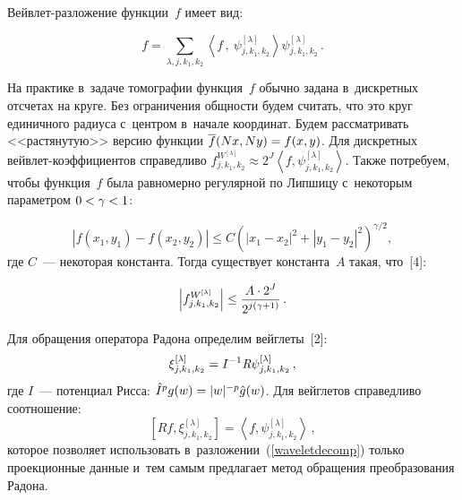 \begin{multicols}{2}
Вейвлет-разложение функции~$f$ имеет вид:

\vspace*{4pt}

\noindent
\begin{equation}
\label{waveletdecomp}
f = \sum\limits_{\lambda,j,k_1,k_2} \left\langle f\,,\
\psi^{[\lambda]}_{j,k_1,k_2}\right\rangle \psi^{[\lambda]}_{j,k_1,k_2}\,.
\end{equation}


\vspace*{-2pt}

На практике в~задаче томографии функция~$f$ обычно задана в~дискретных отсчетах
на круге. Без ограничения общности будем считать, что это круг
единичного радиуса с~центром в~начале координат.
Будем рассматривать <<растянутую>> версию функции
$ \overline{f} (Nx,Ny) \hm= f(x,y)$.
Для дискретных вейв\-лет-ко\-эф\-фи\-ци\-ен\-тов справедливо
$f_{j,k_1,k_2}^{W^{[\lambda]}} \approx 2^{J} \left\langle f,
\psi^{[\lambda]}_{j,k_1,k_2} \right\rangle$.
Также потребуем, чтобы функция~$f$ была равномерно регулярной по
Липшицу с~некоторым параметром $0\hm<\gamma\hm<1$:

\noindent
\begin{equation*}
\left\vert f(x_1,y_1) - f(x_2,y_2)\right\vert
\leq C\!\left(\!\left\vert x_1 - x_2\right\vert^2\! + \!
\left\vert y_1 - y_2\right\vert^2\right)^{\!\gamma/2}\!\!,
\end{equation*}
где $C$~--- некоторая константа. Тогда существует константа~$A$ такая, что~[4]:

\noindent
\begin{align}
\label{Coeff_Decay}
\left\vert f_{j,k_1,k_2}^{W^{[\lambda]}}\right\vert \leq \displaystyle\frac{\displaystyle A \cdot 2^{J}\mathstrut}{\displaystyle 2^{j(\gamma+1)}\mathstrut}\,.
\end{align}

Для обращения оператора Радона определим вейглеты~[2]:
\begin{equation}
\xi_{j,k_1,k_2}^{[\lambda]} = I^{-1}\textit{R}\psi_{j,k_1,k_2}^{[\lambda]}\,,
\label{Radon_vaguelette}
\end{equation}
где $I$~--- потенциал Рисса:
$\hat{I}^{p} g(w) \hm= |w|^{-p} \hat{g}(w)$. Для вейглетов справедливо соотношение:
\begin{equation*}
\left[R f, \xi_{j,k_1,k_2}^{[\lambda]}\right] = \left\langle
f,\psi_{j,k_1,k_2}^{[\lambda]}\right\rangle\,,
\end{equation*}
которое позволяет использовать в~разложении~(\ref{waveletdecomp})
только проекционные данные и~тем самым предлагает метод обращения преобразования
Радона.



\end{multicols}
